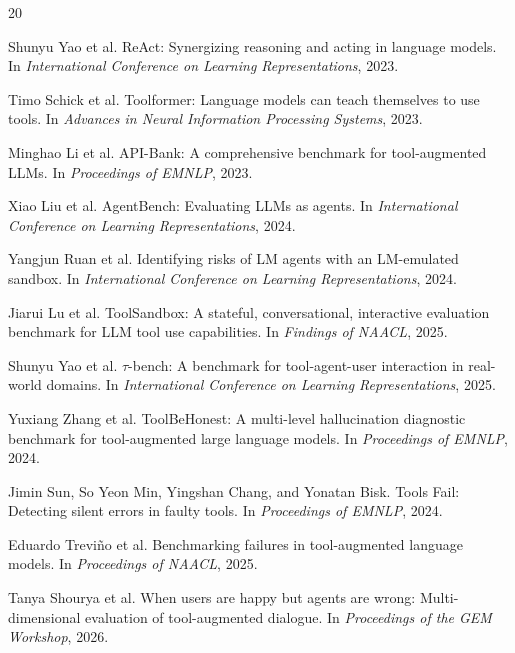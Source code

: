 \documentclass[conference]{IEEEtran}
\begin{document}
\begin{thebibliography}{20}
\footnotesize
\setlength{\itemsep}{0em}
\setlength{\parsep}{0em}

Shunyu Yao et al.
\newblock ReAct: Synergizing reasoning and acting in language models.
\newblock In \emph{International Conference on Learning Representations}, 2023.

Timo Schick et al.
\newblock Toolformer: Language models can teach themselves to use tools.
\newblock In \emph{Advances in Neural Information Processing Systems}, 2023.

Minghao Li et al.
\newblock API-Bank: A comprehensive benchmark for tool-augmented LLMs.
\newblock In \emph{Proceedings of EMNLP}, 2023.

Xiao Liu et al.
\newblock AgentBench: Evaluating LLMs as agents.
\newblock In \emph{International Conference on Learning Representations}, 2024.

Yangjun Ruan et al.
\newblock Identifying risks of LM agents with an LM-emulated sandbox.
\newblock In \emph{International Conference on Learning Representations}, 2024.

Jiarui Lu et al.
\newblock ToolSandbox: A stateful, conversational, interactive evaluation
benchmark for LLM tool use capabilities.
\newblock In \emph{Findings of NAACL}, 2025.

Shunyu Yao et al.
\newblock $\tau$-bench: A benchmark for tool-agent-user interaction in
real-world domains.
\newblock In \emph{International Conference on Learning Representations}, 2025.

Yuxiang Zhang et al.
\newblock ToolBeHonest: A multi-level hallucination diagnostic benchmark for
tool-augmented large language models.
\newblock In \emph{Proceedings of EMNLP}, 2024.

Jimin Sun, So Yeon Min, Yingshan Chang, and Yonatan Bisk.
\newblock Tools Fail: Detecting silent errors in faulty tools.
\newblock In \emph{Proceedings of EMNLP}, 2024.

Eduardo Trevi{\~n}o et al.
\newblock Benchmarking failures in tool-augmented language models.
\newblock In \emph{Proceedings of NAACL}, 2025.

Tanya Shourya et al.
\newblock When users are happy but agents are wrong: Multi-dimensional
evaluation of tool-augmented dialogue.
\newblock In \emph{Proceedings of the GEM Workshop}, 2026.


\end{thebibliography}
\end{document}
